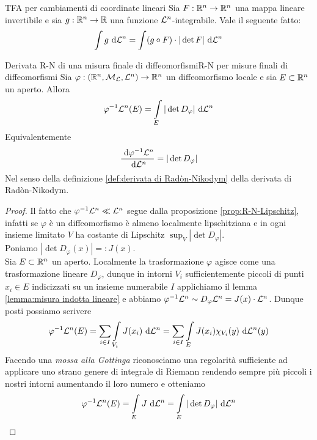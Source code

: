\documentclass{article}
\begin{document}
\begin{theorem}{TFA per cambiamenti di coordinate lineari}{}
    Sia $F : \mathbb{R}^n \to \mathbb{R}^n$ una mappa lineare invertibile e sia $g: \mathbb{R}^n \to \mathbb{R}$ una funzione $\mathcal{L}^n$-integrabile. Vale il seguente fatto:
    \[\intop g \de \L^n = \intop (g \circ F) \cdot |\det F| \de \L^n \] 
\end{theorem}


\begin{theorem}{Derivata R-N di una misura finale di diffeomorfismi}{R-N per misure finali di diffeomorfismi}
    Sia $\varphi : (\mathbb{R}^n, \mathcal{M}_{\mathcal{L}}, \mathcal{L}^n) \to \mathbb{R}^n$ un diffeomorfismo locale e sia $E \subset \mathbb{R}^n$ un aperto. Allora 
    \[\varphi^{-1}\L^n(E) = \intop_E|\det D_\varphi|\de \L^n\]
    Equivalentemente
    \[\frac{\text{ d} \varphi^{-1} \mathcal{L}^n}{\text{ d} \mathcal{L}^n} = |\det D_\varphi|\]
    Nel senso della definizione \ref{def:derivata di Radòn-Nikodym} della derivata di Radòn-Nikodym.
    \begin{proof}
        Il fatto che $\varphi^{-1}\mathcal{L}^n \ll \mathcal{L}^n$ segue dalla proposizione \ref{prop:R-N-Lipschitz}, infatti se $\varphi$ è un diffeomorfismo è almeno localmente lipschitziana e in ogni insieme limitato $V$ ha costante di Lipschitz $\sup_V |\det D_\varphi|$.\\
        Poniamo $|\det D_\varphi(x)| =: J(x)$.\\
        Sia $E\subset \mathbb{R}^n$ un aperto. Localmente la trasformazione $\varphi$ agisce come una trasformazione lineare $D_\varphi$, dunque in intorni $V_i$ sufficientemente piccoli di punti $x_i\in E$ indicizzati su un insieme numerabile $I$ applichiamo il lemma \ref{lemma:misura indotta lineare} e abbiamo $\varphi^{-1} \mathcal{L}^n \sim D_\varphi \mathcal{L}^n = J(x)\cdot \mathcal{L}^n$. Dunque posti possiamo scrivere
        \[\varphi^{-1}\L^n(E) = \sum_{i \in I} \intop_{V_i} J(x_i)\de \L^n = \sum_{i \in I} \intop_E J(x_i) \chi_{V_i}(y)\de \L^n(y)\]
        Facendo una \textit{mossa alla Gottinga} riconosciamo una regolarità sufficiente ad applicare uno strano genere di integrale di Riemann rendendo sempre più piccoli i nostri intorni aumentando il loro numero e otteniamo
        \[\varphi^{-1}\L^n(E) = \intop_E J \de \L^n = \intop_E |\det D_\varphi|\de \L^n\]
    \end{proof} 
\end{theorem}
\end{document}

